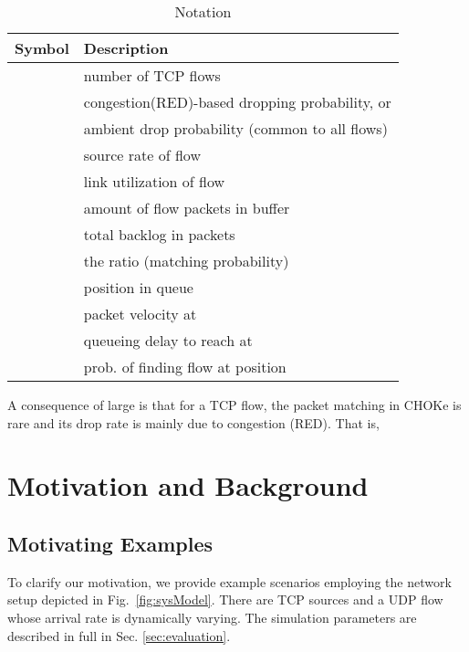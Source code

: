 \documentclass{IEEEtran}
\begin{document}
        \begin{table}[h!]\centering
         \caption{Notation}
\label{tab:notation}
         \begin{small}
         \begin{tabular}{| l l |}
         \hline
           Symbol &     Description    \\ [3pt]
           \hline
                  & number of TCP flows                                          \\
     & congestion(RED)-based dropping probability, or              \\
                & ambient drop probability (common to all flows)                    \\
               & source rate of flow                                        \\
             & link utilization of flow                                   \\
               & amount of flow  packets in buffer                                    \\
                 & total backlog    in packets           \\
               & the ratio  (matching probability)                      \\

   &position in queue                                     \\
                  & packet velocity at                                     \\
               & queueing delay to reach at                             \\
                & prob. of finding flow  at position  \\
           \hline
    \end{tabular}
    \end{small}
    \end{table}

    A consequence of large  is that for a TCP flow, the packet matching in CHOKe is rare and its drop rate is mainly due to congestion (RED). That is,
    


\section{Motivation and Background}\label{sec:motivationBackgnd}
    \subsection{Motivating Examples}\label{subsec:motivation}
To clarify our motivation, we provide example scenarios employing the network setup depicted in Fig.~\ref{fig:sysModel}. There are  TCP sources and a UDP flow whose arrival rate is dynamically varying. The simulation parameters are described in full in Sec. \ref{sec:evaluation}.
\end{document}

